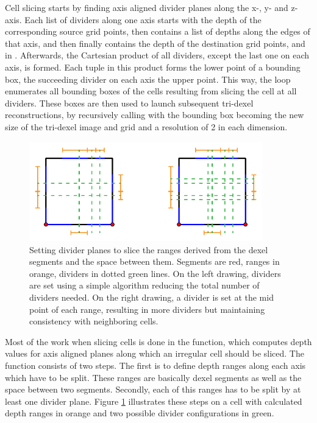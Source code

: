 %
Cell slicing starts by finding axis aligned divider planes along the x-, y- and z-axis.
Each list of dividers along one axis starts with the depth of the corresponding source grid points, then contains a list of depths along the edges of that axis, and then finally contains the depth of the destination grid points, \cf {} and  in .
Afterwards, the Cartesian product of all dividers, except the last one on each axis, is formed.
Each tuple in this product forms the lower point of a bounding box, the succeeding divider on each axis the upper point.
This way, the loop enumerates all bounding boxes of the cells resulting from slicing the cell at all dividers.
These boxes are then used to launch subsequent tri-dexel reconstructions, by recursively calling  with the bounding box becoming the new size of the tri-dexel image and grid and a resolution of 2 in each dimension.

\begin{figure}
	\centering
	\includegraphics[width=0.9\textwidth]{images/cellslicing_dividers}
	\caption{
		Setting divider planes to slice the ranges derived from the dexel segments and the space between them.
		Segments are red, ranges in orange, dividers in dotted green lines.
		On the left drawing, dividers are set using a simple algorithm reducing the total number of dividers needed.
		On the right drawing, a divider is set at the mid point of each range, resulting in more dividers but maintaining consistency with neighboring cells.
	}
	\label{fig:cellslicing_dividers}
\end{figure}

Most of the work when slicing cells is done in the  function, which computes depth values for axis aligned planes along which an irregular cell should be sliced.
The function consists of two steps.
The first is to define depth ranges along each axis which have to be split.
These ranges are basically dexel segments as well as the space between two segments.
Secondly, each of this ranges has to be split by at least one divider plane.
Figure \ref{fig:cellslicing_dividers} illustrates these steps on a cell with calculated depth ranges in orange and two possible divider configurations in green.

